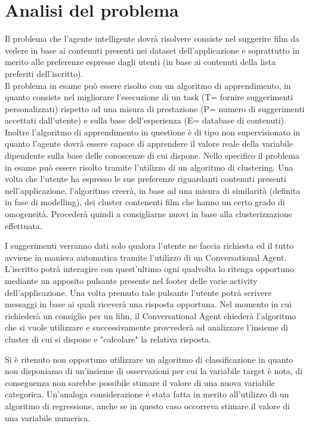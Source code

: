 \documentclass[a4paper, 10pt]{report}
\begin{document}
        \section{Analisi del problema}\label{sec:analisi-del-problema}

            Il problema che l'agente intelligente dovrà risolvere consiste nel suggerire film da vedere in base ai contenuti
            presenti nei dataset dell'applicazione e soprattutto in merito alle preferenze espresse dagli utenti (in base ai
            contenuti della lista preferiti dell'iscritto).\\
            Il problema in esame può essere risolto con un algoritmo di apprendimento, in quanto consiste nel migliorare l'esecuzione
            di un task (T= fornire suggerimenti personalizzati) rispetto ad una misura di prestazione (P= numero di suggerimenti accettati
            dall'utente) e sulla base dell'esperienza (E= database di contenuti). Inoltre l'algoritmo di apprendimento
            in questione è di tipo non supervisionato in quanto l'agente dovrà essere capace di apprendere il valore reale della
            variabile dipendente sulla base delle conoscenze di cui dispone.
            Nello specifico il problema in esame può essere risolto tramite l'utilizzo di un algoritmo di clustering. Una volta che l'utente
            ha espresso le sue preferenze riguardanti contenuti presenti nell'applicazione, l'algoritmo creerà, in base ad una misura di similarità
            (definita in fase di modelling), dei cluster contenenti film che hanno un certo grado di omogeneità. Procederà quindi a consigliarne nuovi
            in base alla clusterizzazione effettuata.

            I suggerimenti verranno dati solo qualora l'utente ne faccia richiesta ed il tutto avviene in maniera automatica tramite l'utilizzo
            di un Conversational Agent. L'iscritto potrà interagire con quest'ultimo ogni qualvolta lo ritenga opportuno mediante un apposito
            pulsante presente nel footer delle varie activity dell'applicazione. Una volta premuto tale pulsante l'utente potrà scrivere messaggi
            in base ai quali riceverà una risposta opportuna. Nel momento in cui richiederà un consiglio per un film, il Conversational Agent
            chiederà l'algoritmo che si vuole utilizzare e successivamente provvederà ad analizzare l'insieme di cluster di cui si dispone e
            "calcolare" la relativa risposta.

            Si è ritenuto non opportuno utilizzare un algoritmo di classificazione in quanto non disponiamo di un'insieme di osservazioni per cui
            la variabile target è nota, di conseguenza non sarebbe possibile stimare il valore di una nuova variabile categorica.
            Un'analoga considerazione è stata fatta in merito all'utilizzo di un algoritmo di regressione, anche se in questo caso occorreva
            stimare il valore di una variabile numerica.
\end{document}
